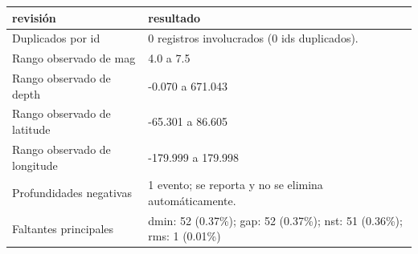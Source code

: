 \begin{tabular}{ll}
\toprule
revisión & resultado \\
\midrule
Duplicados por id & 0 registros involucrados (0 ids duplicados). \\
Rango observado de mag & 4.0 a 7.5 \\
Rango observado de depth & -0.070 a 671.043 \\
Rango observado de latitude & -65.301 a 86.605 \\
Rango observado de longitude & -179.999 a 179.998 \\
Profundidades negativas & 1 evento; se reporta y no se elimina automáticamente. \\
Faltantes principales & dmin: 52 (0.37\%); gap: 52 (0.37\%); nst: 51 (0.36\%); rms: 1 (0.01\%) \\
\bottomrule
\end{tabular}
